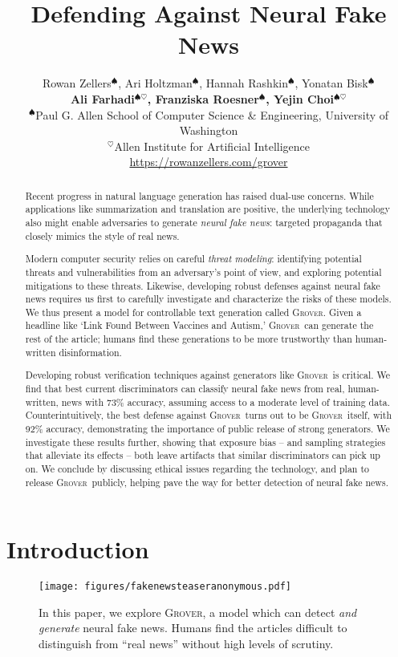 \documentclass{article}
\title{Defending Against Neural Fake News}
\author{Rowan Zellers$^\spadesuit$, Ari Holtzman$^\spadesuit$, Hannah Rashkin$^\spadesuit$, Yonatan Bisk$^\spadesuit$ \\ \textbf{Ali Farhadi$^{\spadesuit\heartsuit}$, Franziska Roesner$^\spadesuit$, Yejin Choi$^{\spadesuit\heartsuit}$}\\
  $^\spadesuit$Paul G. Allen School of Computer Science \& Engineering, University of Washington \\
  $^\heartsuit$Allen Institute for Artificial Intelligence \\
  \url{https://rowanzellers.com/grover}
}
\newcommand{\modelname}{{\textsc{Grover}}}
\begin{document}
\maketitle

\begin{abstract}
 \vspace{-2mm}
Recent progress in natural language generation has raised dual-use concerns. While applications like summarization and translation are positive, the underlying technology also might enable adversaries to generate \emph{neural fake news}: targeted propaganda that closely mimics the style of real news.

Modern computer security relies on careful \emph{threat modeling}: identifying potential threats and vulnerabilities from an adversary's point of view, and exploring potential mitigations to these threats.
Likewise, developing robust defenses against neural fake news requires us first to carefully investigate and characterize the risks of these models. We thus present a model for controllable text generation called \modelname. Given a headline like `Link Found Between Vaccines and Autism,' \modelname~can generate the rest of the article; humans find these generations to be more trustworthy than human-written disinformation.

Developing robust verification techniques against generators like \modelname~is critical.
We find that best current discriminators can classify neural fake news from real, human-written, news with 73\% accuracy, assuming access to a moderate level of training data. Counterintuitively, the best defense against \modelname~turns out to be \modelname~itself, with 92\% accuracy, demonstrating the importance of public release of strong generators. We investigate these results further, showing that exposure bias -- and sampling strategies that alleviate its effects -- both leave artifacts that similar discriminators can pick up on.
We conclude by discussing ethical issues regarding the technology, and plan to release \modelname~publicly, helping pave the way for better detection of neural fake news.  \vspace{-2mm}
\end{abstract}

\section{Introduction}
\begin{figure}[b!]
\vspace{-3mm}
  \centering\small
    \texttt{[image: figures/fakenewsteaseranonymous.pdf]}
    \vspace{-4mm}
\caption{In this paper, we explore \modelname, a model which can detect \emph{and generate} neural fake news. Humans find the articles difficult to distinguish from ``real news'' without high levels of scrutiny.}
\vspace{-5mm}
  \label{fig:teaser}
\end{figure}
\end{document}
